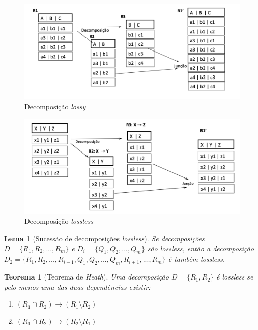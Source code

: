 \documentclass[oneside]{book}
\newtheorem{theorem}{Teorema}
\newtheorem{lemma}{Lema}
\theoremstyle{definition}
\begin{document}
\begin{figure}[h]
    \centering
    \includegraphics[scale = 0.75]{cap_norm/lossy.png}
    \caption{Decomposição \textit{lossy}}
\end{figure}

\begin{figure}[h]
    \centering
    \includegraphics[scale = 0.75]{cap_norm/lossless.png}
    \caption{Decomposição \textit{lossless}}
\end{figure}

\begin{lemma} [Sucessão de decomposições \textit{lossless}]
    Se decomposições $D = \{R_1, R_2, ..., R_m\}$ e $D_i = \{Q_1, Q_2, ..., Q_m\}$ são \textit{lossless}, então a decomposição $D_2 = \{ R_1, R_2, ..., R_{i - 1}, Q_1, Q_2, ..., Q_m, R_{i + 1}, ...,  R_m\}$ é também \textit{lossless}.
\end{lemma}

\begin{theorem} [Teorema de \textit{Heath}]
    Uma decomposição $D = \{R_1, R_2\}$ é \textit{lossless} se pelo menos uma das duas dependências existir:
    \begin{enumerate}
        \item $(R_1 \cap R_2) \rightarrow (R_1 \setminus R_2)$
        \item  $(R_1 \cap R_2) \rightarrow (R_2 \setminus R_1)$
    \end{enumerate}
\end{theorem}
\end{document}
